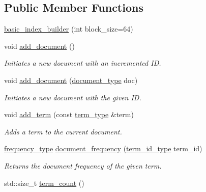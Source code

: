 \subsection*{Public Member Functions}
\begin{DoxyCompactItemize}
\item 
\mbox{\hyperlink{classirk_1_1basic__index__builder_a82fdaa57c7b4db8620fc4633d8359f77}{basic\+\_\+index\+\_\+builder}} (int block\+\_\+size=64)
\item 
void \mbox{\hyperlink{classirk_1_1basic__index__builder_a1259cef9edadcf01b310dc7bbfae366d}{add\+\_\+document}} ()
\begin{DoxyCompactList}\small\item\em Initiates a new document with an incremented ID. \end{DoxyCompactList}\item 
void \mbox{\hyperlink{classirk_1_1basic__index__builder_acbaea2f2be4a4210d126d904277a8206}{add\+\_\+document}} (\mbox{\hyperlink{classirk_1_1basic__index__builder_a757a96c8851f4aeee2014a74f60b183e}{document\+\_\+type}} doc)
\begin{DoxyCompactList}\small\item\em Initiates a new document with the given ID. \end{DoxyCompactList}\item 
void \mbox{\hyperlink{classirk_1_1basic__index__builder_a7eb14756ab6e8b0a45ff1e967997709b}{add\+\_\+term}} (const \mbox{\hyperlink{classirk_1_1basic__index__builder_a612e4d83700711a72d442056226a2908}{term\+\_\+type}} \&term)
\begin{DoxyCompactList}\small\item\em Adds a term to the current document. \end{DoxyCompactList}\item 
\mbox{\hyperlink{classirk_1_1basic__index__builder_a17364f665244bc4dc6b021f52442f794}{frequency\+\_\+type}} \mbox{\hyperlink{classirk_1_1basic__index__builder_a43dbe8e0d0274efbce2d37075fd03056}{document\+\_\+frequency}} (\mbox{\hyperlink{classirk_1_1basic__index__builder_a468351209183fbd35691ab9b75f10d61}{term\+\_\+id\+\_\+type}} term\+\_\+id)
\begin{DoxyCompactList}\small\item\em Returns the document frequency of the given term. \end{DoxyCompactList}\item 
std\+::size\+\_\+t \mbox{\hyperlink{classirk_1_1basic__index__builder_a3e3ae890adf282fda311ede956c82a15}{term\+\_\+count}} ()

\end{DoxyCompactItemize}
